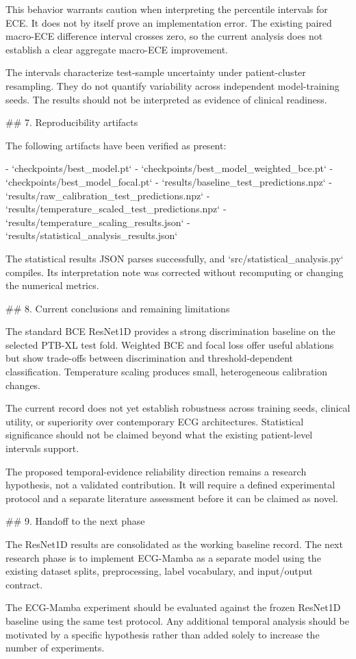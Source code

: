 This behavior warrants caution when interpreting the percentile intervals for ECE. It does not by itself prove an implementation error. The existing paired macro-ECE difference interval crosses zero, so the current analysis does not establish a clear aggregate macro-ECE improvement.

The intervals characterize test-sample uncertainty under patient-cluster resampling. They do not quantify variability across independent model-training seeds. The results should not be interpreted as evidence of clinical readiness.

## 7. Reproducibility artifacts

The following artifacts have been verified as present:

- `checkpoints/best_model.pt`
- `checkpoints/best_model_weighted_bce.pt`
- `checkpoints/best_model_focal.pt`
- `results/baseline_test_predictions.npz`
- `results/raw_calibration_test_predictions.npz`
- `results/temperature_scaled_test_predictions.npz`
- `results/temperature_scaling_results.json`
- `results/statistical_analysis_results.json`

The statistical results JSON parses successfully, and `src/statistical_analysis.py` compiles. Its interpretation note was corrected without recomputing or changing the numerical metrics.

## 8. Current conclusions and remaining limitations

The standard BCE ResNet1D provides a strong discrimination baseline on the selected PTB-XL test fold. Weighted BCE and focal loss offer useful ablations but show trade-offs between discrimination and threshold-dependent classification. Temperature scaling produces small, heterogeneous calibration changes.

The current record does not yet establish robustness across training seeds, clinical utility, or superiority over contemporary ECG architectures. Statistical significance should not be claimed beyond what the existing patient-level intervals support.

The proposed temporal-evidence reliability direction remains a research hypothesis, not a validated contribution. It will require a defined experimental protocol and a separate literature assessment before it can be claimed as novel.

## 9. Handoff to the next phase

The ResNet1D results are consolidated as the working baseline record. The next research phase is to implement ECG-Mamba as a separate model using the existing dataset splits, preprocessing, label vocabulary, and input/output contract.

The ECG-Mamba experiment should be evaluated against the frozen ResNet1D baseline using the same test protocol. Any additional temporal analysis should be motivated by a specific hypothesis rather than added solely to increase the number of experiments.